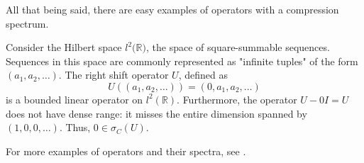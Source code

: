 All that being said, there are easy examples of operators with a compression
spectrum.
\begin{example}
    Consider the Hilbert space $l^2(\mathbb{R)}$, the space of
    square-summable sequences. Sequences in this space are commonly represented
    as "infinite tuples" of the form $(a_1, a_2,\hdots)$. The right shift
    operator $U$, defined as
    \[
        U((a_1,a_2,\hdots)) = (0,a_1,a_2,\hdots)
        \]
    is a bounded linear operator on $l^2(\mathbb{R})$. Furthermore,
    the operator $U-0I = U$ does not have dense range: it misses the entire
    dimension spanned by $(1,0,0,\hdots)$. Thus, $0\in\sigma_C(U)$.
\end{example}

For more examples of operators and their spectra, see
\cite[Ch. 6.5]{Kubrusly2011}.
